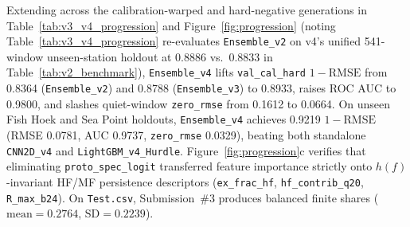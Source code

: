 \documentclass[10pt,a4paper]{article}
\begin{document}
Extending across the calibration-warped and hard-negative generations in Table~\ref{tab:v3_v4_progression} and Figure~\ref{fig:progression} (noting Table~\ref{tab:v3_v4_progression} re-evaluates \texttt{Ensemble\_v2} on v4's unified 541-window unseen-station holdout at 0.8886 vs.\ 0.8833 in Table~\ref{tab:v2_benchmark}), \texttt{Ensemble\_v4} lifts \texttt{val\_cal\_hard} $1-\mathrm{RMSE}$ from 0.8364 (\texttt{Ensemble\_v2}) and 0.8788 (\texttt{Ensemble\_v3}) to 0.8933, raises ROC AUC to 0.9800, and slashes quiet-window \texttt{zero\_rmse} from 0.1612 to 0.0664. On unseen Fish Hoek and Sea Point holdouts, \texttt{Ensemble\_v4} achieves 0.9219 $1-\mathrm{RMSE}$ (RMSE 0.0781, AUC 0.9737, \texttt{zero\_rmse} 0.0329), beating both standalone \texttt{CNN2D\_v4} and \texttt{LightGBM\_v4\_Hurdle}. Figure~\ref{fig:progression}c verifies that eliminating \texttt{proto\_spec\_logit} transferred feature importance strictly onto $h(f)$-invariant HF/MF persistence descriptors (\texttt{ex\_frac\_hf}, \texttt{hf\_contrib\_q20}, \texttt{R\_max\_b24}). On \texttt{Test.csv}, Submission~\#3 produces balanced finite shares ($\mathrm{mean} = 0.2764$, $\mathrm{SD} = 0.2239$).
\end{document}
